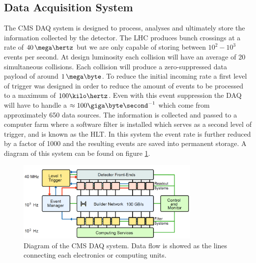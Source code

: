\subsection{Data Acquisition System}
\label{SUBSECTION:ExperimentalApparatus_CMS_DAQ}


The \gls{CMS} \gls{DAQ} system is designed to process, analyses and ultimately store the information collected by the detector. The \gls{LHC} produces bunch crossings at a rate of $40\,\mega\hertz$ but we are only capable of storing between $10^2-10^3$ events per second. At design luminosity each collision will have an average of 20 simultaneous collisions. Each collision will produce a zero-suppressed data payload of around $1\,\mega\byte$. To reduce the initial incoming rate a first level of trigger was designed in order to reduce the amount of events to be processed to a maximum of $100 \kilo\hertz$. Even with this event suppression the \gls{DAQ} will have to handle a $\approx 100 \giga\byte\second^{-1}$ which come from approximately 650 data sources. The information is collected and passed to a computer farm where a software filter is installed which serves as a second level of trigger, and is known as the \gls{HLT}. In this system the event rate is further reduced by a factor of 1000 and the resulting events are saved into permanent storage. A diagram of this system can be found on figure \ref{FIGURE:ExperimentalApparatus_CMS_DAQ_Diagram}.

\begin{figure}[!htb]
  \centering
  \includegraphics[width=0.80\textwidth]{Chapter02/CMS/Images/CMS_DAQ_Diagram.png}
  \caption{Diagram of the \gls{CMS} \gls{DAQ} system. Data flow is showed as the lines connecting each electronics or computing units.}
  \label{FIGURE:ExperimentalApparatus_CMS_DAQ_Diagram}
\end{figure}

